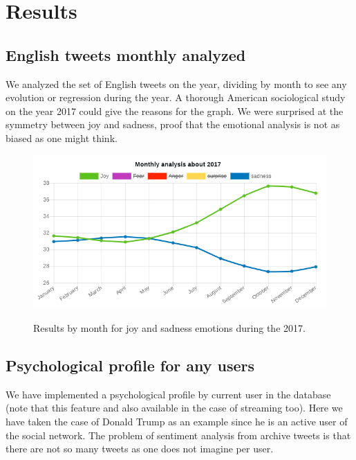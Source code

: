 \documentclass{acmtog} %
\begin{document}
\section{Results}
\label{sub:results}

\subsection{English tweets monthly analyzed}
\label{subsub:english_tweets_monthly}

We analyzed the set of English tweets on the year, dividing by month to see any evolution or regression during the year. A thorough American sociological study on the year 2017 could give the reasons for the graph. We were surprised at the symmetry between joy and sadness, proof that the emotional analysis is not as biased as one might think. 


\begin{figure}[h!]
{\includegraphics[width=\linewidth]{monthly_analysis_joy_sadness-exemple.png}}
\caption{Results by month for joy and sadness emotions during the 2017.}
  \label{fig:trump_results}
\end{figure}




\subsection{Psychological profile for any users}
\label{subsub:psychological_profile}

We have implemented a psychological profile by current user in the database (note that this feature and also available in the case of streaming too). Here we have taken the case of Donald Trump as an example since he is an active user of the social network.
The problem of sentiment analysis from archive tweets is that there are not so many tweets as one does not imagine per user.
\end{document}
